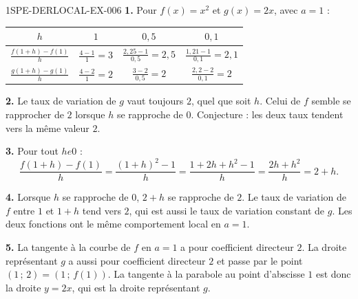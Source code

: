 \begin{corrige}{1SPE-DERLOCAL-EX-006}
\textbf{1.} Pour $f(x)=x^2$ et $g(x)=2x$, avec $a=1$ :

\begin{center}
\begin{tabular}{c|ccc}
$h$ & $1$ & $0{,}5$ & $0{,}1$ \\\hline
$\frac{f(1+h)-f(1)}{h}$ & $\frac{4-1}{1}=3$ & $\frac{2{,}25-1}{0{,}5}=2{,}5$ & $\frac{1{,}21-1}{0{,}1}=2{,}1$ \\[6pt]
$\frac{g(1+h)-g(1)}{h}$ & $\frac{4-2}{1}=2$ & $\frac{3-2}{0{,}5}=2$ & $\frac{2{,}2-2}{0{,}1}=2$
\end{tabular}
\end{center}

\textbf{2.} Le taux de variation de $g$ vaut toujours $2$, quel que soit $h$. Celui de $f$ semble se rapprocher de $2$ lorsque $h$ se rapproche de $0$. Conjecture : les deux taux tendent vers la même valeur $2$.

\textbf{3.} Pour tout $h
e 0$ :
\[
\frac{f(1+h)-f(1)}{h}=\frac{(1+h)^2-1}{h}=\frac{1+2h+h^2-1}{h}=\frac{2h+h^2}{h}=2+h.
\]

\textbf{4.} Lorsque $h$ se rapproche de $0$, $2+h$ se rapproche de $2$. Le taux de variation de $f$ entre $1$ et $1+h$ tend vers $2$, qui est aussi le taux de variation constant de $g$. Les deux fonctions ont le même comportement local en $a=1$.

\textbf{5.} La tangente à la courbe de $f$ en $a=1$ a pour coefficient directeur $2$. La droite représentant $g$ a aussi pour coefficient directeur $2$ et passe par le point $(1\,;\,2)=(1\,;\,f(1))$. La tangente à la parabole au point d'abscisse $1$ est donc la droite $y=2x$, qui est la droite représentant $g$.
\end{corrige}
